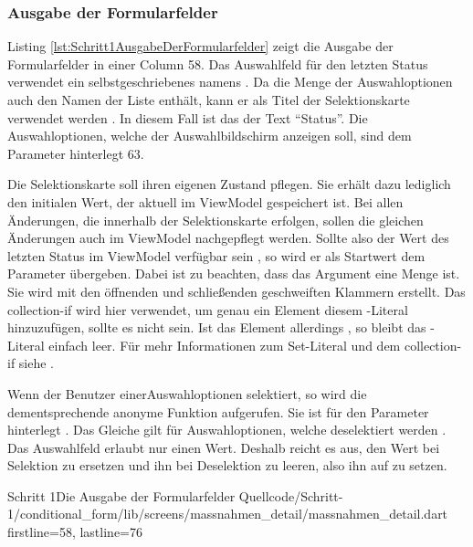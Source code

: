 \clearpage

\subsubsection{Ausgabe der Formularfelder}

Listing \ref{lst:Schritt1AusgabeDerFormularfelder} zeigt die Ausgabe der Formularfelder in einer Column 58.
Das Auswahlfeld für den letzten Status verwendet ein selbstgeschriebenes  namens  .
Da die Menge der Auswahloptionen auch den Namen der Liste enthält, kann er als Titel der Selektionskarte verwendet werden . In diesem Fall ist das der Text \enquote{Status}.
Die Auswahloptionen, welche  der Auswahlbildschirm anzeigen soll, sind dem Parameter  hinterlegt 63.

Die Selektionskarte soll ihren eigenen Zustand pflegen.
Sie erhält dazu lediglich den initialen Wert, der aktuell im ViewModel gespeichert ist.
Bei allen Änderungen, die innerhalb der Selektionskarte erfolgen, sollen die gleichen Änderungen auch im ViewModel nachgepflegt werden.
Sollte also der Wert des letzten Status im ViewModel verfügbar sein , so wird er als Startwert dem Parameter   übergeben.
Dabei ist zu beachten, dass das Argument eine Menge ist.
Sie wird mit den  öffnenden und schließenden geschweiften Klammern erstellt.
Das collection-if wird hier verwendet, um genau ein Element diesem -Literal hinzuzufügen, sollte es nicht  sein.
Ist das Element allerdings , so bleibt das -Literal einfach leer.
Für mehr Informationen zum Set-Literal und dem collection-if siehe .


Wenn der Benutzer einerAuswahloptionen selektiert, so  wird die dementsprechende anonyme Funktion aufgerufen.
Sie ist für den Parameter  hinterlegt .
Das Gleiche gilt für Auswahloptionen, welche deselektiert werden .
Das Auswahlfeld erlaubt nur einen Wert.
Deshalb reicht es aus, den Wert bei Selektion zu ersetzen und ihn bei Deselektion zu leeren, also ihn auf  zu setzen.


\begin{alexlisting}{Schritt 1}{Die Ausgabe der Formularfelder}
  {Quellcode/Schritt-1/conditional_form/lib/screens/massnahmen_detail/massnahmen_detail.dart}
  {firstline=58, lastline=76}
  \label{lst:Schritt1AusgabeDerFormularfelder}
\end{alexlisting}



